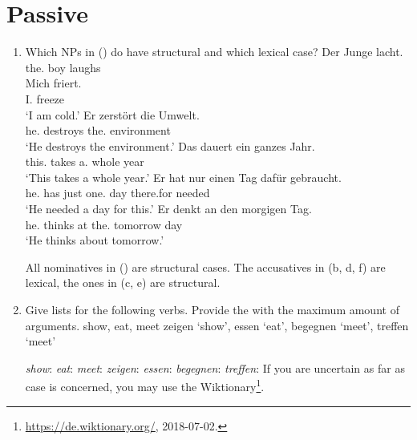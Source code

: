 \section{Passive}

\begin{enumerate}
\item Which NPs in () do have structural and which lexical case?
\eal
\ex 
\gll Der        Junge lacht.\\
     the.\NOM{} boy   laughs\\
\ex 
\gll Mich friert.\\
     I.\ACC{} freeze\\
\glt `I am cold.'
\ex 
\gll Er zerstört die Umwelt.\\
     he.\NOM{} destroys the.\ACC{} environment\\
\glt `He destroys the environment.'
\ex 
\gll Das dauert ein ganzes Jahr.\\
     this.\NOM{} takes  a.\ACC{} whole year\\
\glt `This takes a whole year.'
\ex 
\gll Er hat nur einen Tag dafür gebraucht.\\
     he.\NOM{} has just one.\ACC{}  day there.for needed\\
\glt `He needed a day for this.'
\ex 
\gll Er denkt an den morgigen Tag.\\
     he.\NOM{} thinks at the.\ACC{} tomorrow day\\
\glt `He thinks about tomorrow.'
\zl

All nominatives in () are structural cases. The accusatives in (b, d, f) are lexical,
the ones in (c, e) are structural.

\item Give \argst lists for the following verbs. Provide the \argstl with the maximum amount of arguments. 
\eal
\ex show, eat, meet \english
\ex zeigen `show', essen `eat', begegnen `meet', treffen `meet' \german
\zl

\eal
\ex \emph{show}: 
\ex \emph{eat}: 
\ex \emph{meet}: 
\ex \emph{zeigen}: 
\ex \emph{essen}: 
\ex \emph{begegnen}: 
\ex \emph{treffen}: 
\zl
If you are uncertain as far as case is concerned, you may use the
  Wiktionary\footnote{
\url{https://de.wiktionary.org/}, 2018-07-02.
}.


\end{enumerate}
